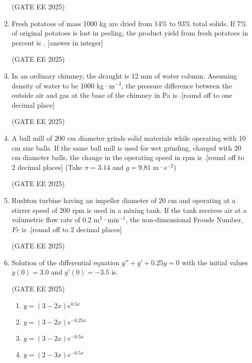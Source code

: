 \documentclass[journal,12pt,onecolumn]{IEEEtran}
\theoremstyle{remark}
\begin{document}
\begin{enumerate}
\hfill(GATE EE 2025)

\item Fresh potatoes of mass 1000 kg are dried from 14\% to 93\% total solids. If 7\% of original potatoes is lost in peeling, the product yield from fresh potatoes in percent is \underline{\hspace{2cm}}. {[answer in integer]}

\hfill(GATE EE 2025)

\item In an ordinary chimney, the draught is 12 mm of water column. Assuming density of water to be 1000 kg·m$^{-3}$, the pressure difference between the outside air and gas at the base of the chimney in Pa is \underline{\hspace{2cm}}.{[round off to one decimal place]}

\hfill(GATE EE 2025)

\item A ball mill of 200 cm diameter grinds solid materials while operating with 10 cm size balls. If the same ball mill is used for wet grinding, charged with 20 cm diameter balls, the change in the operating speed in rpm is \underline{\hspace{2cm}}.{[round off to 2 decimal places] (Take $\pi = 3.14$ and $g = 9.81$ m·s$^{-2}$)}

\hfill(GATE EE 2025)

\item Rushton turbine having an impeller diameter of 20 cm and operating at a stirrer speed of 200 rpm is used in a mixing tank. If the tank receives air at a volumetric flow rate of 0.2 m$^{3}$·min$^{-1}$, the non-dimensional Froude Number, $Fr$ is \underline{\hspace{2cm}}.{[round off to 2 decimal places]}

\hfill(GATE EE 2025)

\item Solution of the differential equation $y'' + y' + 0.25y = 0$ with the initial values $y(0) = 3.0$ and $y'(0) = -3.5$ is.

\hfill(GATE EE 2025)

\begin{multicols}{4}
\begin{enumerate}[label=(\Alph*)]
\item $y = (3 - 2x)e^{0.5x}$
\item $y = (3 - 2x)e^{-0.25x}$
\item $y = (3 - 2x)e^{-0.5x}$
\item $y = (2 - 3x)e^{-0.5x}$
\end{enumerate}
\end{multicols}


\end{enumerate}
\end{document}

